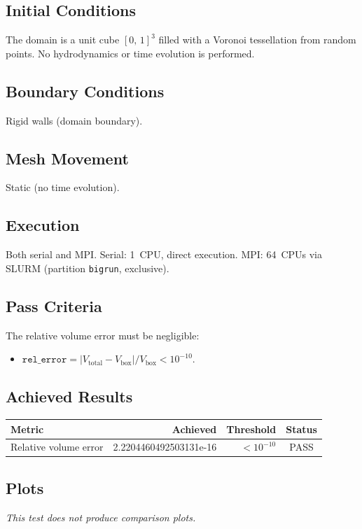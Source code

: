 \documentclass[11pt,a4paper]{article}
\begin{document}
\subsection*{Initial Conditions}
The domain is a unit cube $[0,\,1]^3$ filled with a Voronoi tessellation from random points. No hydrodynamics or time evolution is performed.

\subsection*{Boundary Conditions}
Rigid walls (domain boundary).

\subsection*{Mesh Movement}
Static (no time evolution).

\subsection*{Execution}
Both serial and MPI. Serial: 1~CPU, direct execution. MPI: 64~CPUs via SLURM (partition \texttt{bigrun}, exclusive).

\subsection*{Pass Criteria}
The relative volume error must be negligible:
\begin{itemize}
  \item $\texttt{rel\_error} = |V_{\mathrm{total}} - V_{\mathrm{box}}| / V_{\mathrm{box}} < 10^{-10}$.
\end{itemize}

\subsection*{Achieved Results}
\begin{table}[htbp]
\centering
\begin{tabular}{l r r c}
\toprule
\textbf{Metric} & \textbf{Achieved} & \textbf{Threshold} & \textbf{Status} \\
\midrule
Relative volume error & 2.2204460492503131e-16 & $ < 10^{-10}$ & {\color{green!60!black}PASS} \\
\bottomrule
\end{tabular}
\end{table}

\subsection*{Plots}
\textit{This test does not produce comparison plots.}
\end{document}
